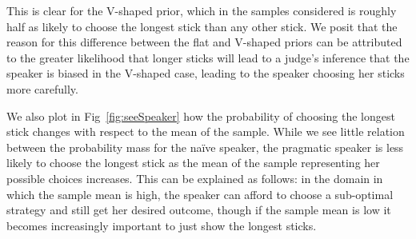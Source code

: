 \documentclass[10pt,letterpaper]{article}
\begin{document}
This is clear for the V-shaped prior, which in the samples considered is roughly half as likely to choose the longest stick than any other stick.
We posit that the reason for this difference between the flat and V-shaped priors can be attributed to the greater likelihood that longer sticks
will lead to a judge's inference that the speaker is biased in the V-shaped case, leading to the speaker choosing her sticks more carefully.

We also plot in Fig~\ref{fig:seeSpeaker} how the probability of choosing the longest stick changes with respect to the mean of the sample.
While we see little relation between the probability mass for the na\"ive speaker, the pragmatic speaker is less likely to choose the longest stick as
the mean of the sample representing her possible choices increases. This can be explained as follows: in the domain in which the sample mean is high, the speaker
can afford to choose a sub-optimal strategy and still get her desired outcome, though if the sample mean is low it becomes 
increasingly important to just show the longest sticks.
\end{document}
